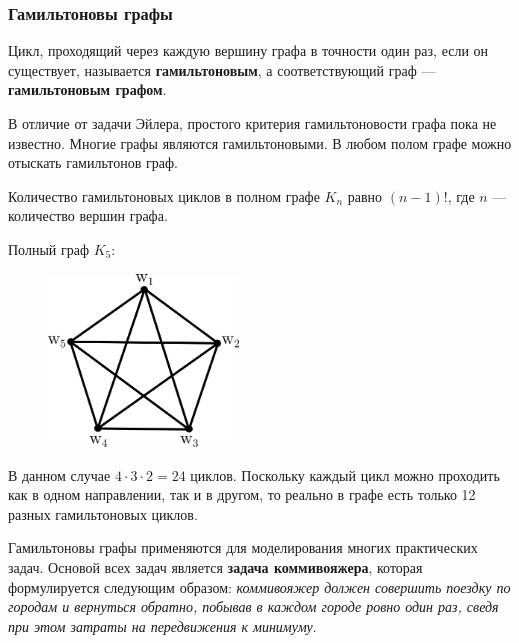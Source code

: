 \subsubsection{Гамильтоновы графы}

Цикл, проходящий через каждую вершину графа в точности один раз, если он существует, называется \textbf{гамильтоновым}, а соответствующий граф --- \textbf{гамильтоновым графом}.

В отличие от задачи Эйлера, простого критерия гамильтоновости графа пока не известно.  Многие графы являются гамильтоновыми. В любом полом графе можно отыскать гамильтонов граф.

Количество гамильтоновых циклов в полном графе \(K_n\) равно \((n - 1)!\), где \(n\) --- количество вершин графа.

\begin{example*}
    Полный граф \(K_5\):

    \begin{figure}[H]
        \centering
        \includegraphics[width=0.45\textwidth]{images/graph-k5-example.png}
    \end{figure}

    В данном случае \(4 \cdot 3 \cdot 2 = 24\) циклов. Поскольку каждый цикл можно проходить как в одном направлении, так и в другом, то реально в графе есть только 12 разных гамильтоновых циклов.
\end{example*}

Гамильтоновы графы применяются для моделирования многих практических задач. Основой всех задач является \textbf{задача коммивояжера}, которая формулируется следующим образом: \textit{коммивояжер должен совершить поездку по городам и вернуться обратно, побывав в каждом городе ровно один раз, сведя при этом затраты на передвижения к минимуму}.

